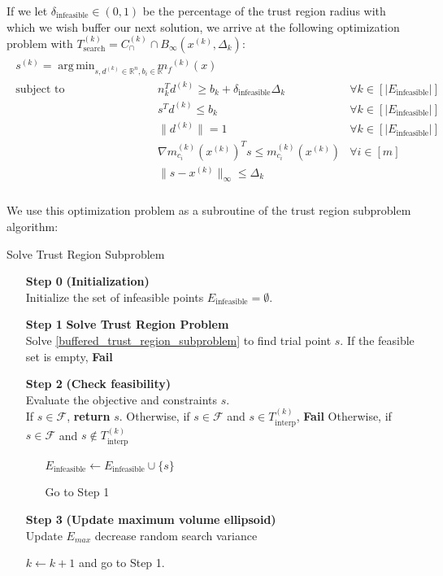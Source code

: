 \documentclass{article}
\theoremstyle{case}
\numberwithin{theorem}{subsection}
\DeclareMathOperator*{\argmin}{arg\,min}
\newcommand{\capcones}{{C^{(k)}_{\cap}}}
\newcommand{\dk}{\Delta_k}
\newcommand{\feasible}{{\mathcal F}}
\newcommand{\mcik}{{{m}^{(k)}_{c_i}}}
\newcommand{\mfk}{{{m}_f}^{(k)}}
\newcommand{\reals}{\mathbb R}
\newcommand{\Rn}{\mathbb R^n}
\newcommand{\sampletrk}{{T_{\text{interp}}^{(k)}}}
\newcommand{\searchtrk}{{T_{\text{search}}^{(k)}}}
\newcommand{\sk}{{{s}^{(k)}}}
\newcommand{\tr}{{ B_{\infty}\left(\xk, \dk\right) }}
\newcommand{\trsinfset}{{E_\textrm{infeasible}}}
\newcommand{\trstol}{{\delta_\textrm{infeasible}}}
\newcommand{\xk}{x^{(k)}}
\begin{document}
If we let $\trstol \in (0, 1)$ be the percentage of the trust region radius with which we wish buffer our next solution, 
we arrive at the following optimization problem with $\searchtrk = \capcones \cap \tr $:
\begin{align}
\label{buffered_trust_region_subproblem}
\begin{array}{ccc}
\sk = \argmin_{s, d^{(k)} \in \Rn, b_i \in \reals}	& \mfk(x) & 	\\
 \mbox{subject to}  & n_k^Td^{(k)} \ge b_k + \trstol \dk& \forall k \in \left[ |\trsinfset |\right] \\
 & s^T d^{(k)} \le b_k &   \forall k \in \left[|\trsinfset |\right]  \\
 & \|d^{(k)}\| = 1 & \forall k \in \left[|\trsinfset |	\right]\\
 & \nabla \mcik(\xk) ^T s \le \mcik(\xk) & \forall i \in [m] \\
 & \|s - \xk \|_{\infty} \le \dk & \\
\end{array}
\end{align}

We use this optimization problem as a subroutine of the trust region subproblem algorithm:

\begin{algorithm}[H]
    \caption{Solve Trust Region Subproblem}
    \label{linear_cut_trust_region_subproblem}
    \begin{itemize}
        \item[\textbf{Step 0}] \textbf{(Initialization)} \\
	    Initialize the set of infeasible points $\trsinfset = \emptyset$.
        
        \item[\textbf{Step 1}] \textbf{Solve Trust Region Problem} \\
	    Solve \cref{buffered_trust_region_subproblem} to find trial point $s$.
	    If the feasible set is empty, \textbf{Fail}
        
        \item[\textbf{Step 2}] \textbf{(Check feasibility)} \\
            Evaluate the objective and constraints $s$. \\
            If $s\in\feasible$, \textbf{return} $s$.
            Otherwise, if $s\in\feasible$ and $s \in \sampletrk$, \textbf{Fail}
	    Otherwise, if $s\in\feasible$ and $s \not \in \sampletrk$ \begin{itemize}
	    	\item[] $\trsinfset \gets \trsinfset \cup \{s\}$
	    	\item[] Go to Step 1
	    \end{itemize}
            
        \item[\textbf{Step 3}] \textbf{(Update maximum volume ellipsoid)} \\
	    Update $E_{max}$
	    decrease random search variance
            
        $k \gets k+1$ and go to Step 1.
    \end{itemize}
\end{algorithm}
\end{document}
